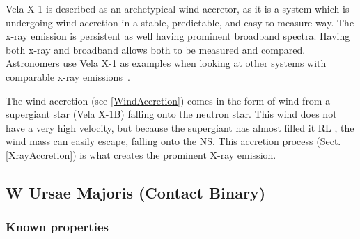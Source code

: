 \documentclass[12pt, a4paper]{article}
\begin{document}
        Vela X-1 is described as an archetypical wind accretor, as it is a system which is undergoing wind accretion in a stable, predictable, and easy to measure way. The x-ray emission is persistent as well having prominent broadband spectra. Having both x-ray and broadband allows both to be measured and compared.  Astronomers use Vela X-1 as examples when looking at other systems with comparable x-ray emissions~\parencite{Kretschmar_2021}.
        
        The wind accretion (see \ref{WindAccretion}) comes in the form of wind from a supergiant star (Vela X-1B) falling onto the neutron star. This wind does not have a very high velocity, but because the supergiant has almost filled it RL \parencite{Kretschmar_2021}, the wind mass can easily escape, falling onto the NS. This accretion process (Sect. \ref{XrayAccretion}) is what creates the prominent X-ray emission.

        
    \subsection{\centering W Ursae Majoris (Contact Binary)}
        \subsubsection{Known properties}
\end{document}
